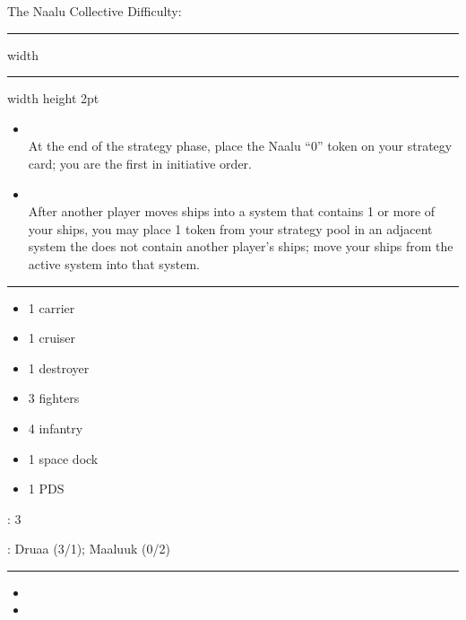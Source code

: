 {\handel\Huge The Naalu Collective} \hfill {\Large Difficulty: \medium} \vspace{-4pt}\\
\hrule width \hsize \kern 1mm \hrule width \hsize height 2pt


\begin{multicols}{2}


\begin{itemize}
\item {}\\
At the end of the strategy phase, place the Naalu ``0'' token on your strategy card; you are the first in initiative order.
\item {}\\
After another player moves ships into a system that contains 1 or more of your ships, you may place 1 token from your strategy pool in an adjacent system the does not contain another player's ships; move your ships from the active system into that system.
\end{itemize}


\vspace{-10pt}\rule{\hsize}{0.4pt}\vspace{5pt}


\vspace{-5pt}
\begin{multicols}{2}
\begin{itemize}
\item 1 carrier
\item 1 cruiser
\item 1 destroyer
\item 3 fighters
\item 4 infantry
\item 1 space dock
\item 1 PDS
\end{itemize}
\end{multicols}

\vspace{-5pt}
: 3

\vspace{2pt}
: Druaa (3/1); Maaluuk (0/2)

\rule{\hsize}{0.4pt}\vspace{5pt}


\begin{itemize}
\item \neural
\item \sarween
\end{itemize}


\end{multicols}
